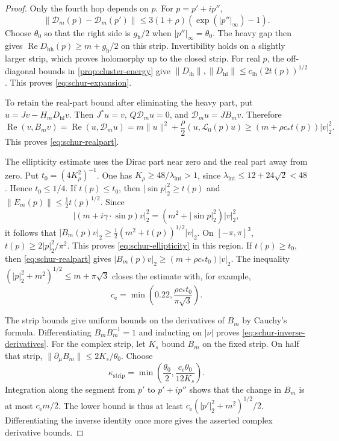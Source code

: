 \begin{proof}
Only the fourth hop depends on $p$. For $p=p'+ip''$,
\[
 \|\mathcal D_m(p)-\mathcal D_m(p')\|
       \le3(1+\rho)(\exp(|p''|_\infty)-1).
\]
Choose $\theta_0$ so that the right side is $g_{\mathrm h}/2$ when
$|p''|_\infty=\theta_0$. The heavy gap then gives
$\operatorname{Re}D_{\mathrm{hh}}(p)\ge m+g_{\mathrm h}/2$ on this
strip. Invertibility holds on a slightly larger strip, which proves
holomorphy up to the closed strip. For real $p$, the off-diagonal bounds
in \cref{prop:cluster-energy} give
$\|D_{\mathrm{lh}}\|,\|D_{\mathrm{hl}}\|
\le c_{\mathrm{lh}}(2t(p))^{1/2}$. This proves
\eqref{eq:schur-expansion}.

To retain the real-part bound after eliminating the heavy part, put
$u=Jv-H_mD_{\mathrm{hl}}v$. Then
$J^*u=v$, $Q\mathcal D_m u=0$, and
$\mathcal D_m u=JB_mv$. Therefore
\[
 \operatorname{Re}(v,B_mv)
   =\operatorname{Re}(u,\mathcal D_m u)
   =m\|u\|^2+\frac\rho2(u,\mathcal L_0(p)u)
   \ge(m+\rho c_*t(p))|v|_2^2.
\]
This proves \eqref{eq:schur-realpart}.

The ellipticity estimate uses the Dirac part near zero and the real
part away from zero. Put $t_0=(4K_\rho^2)^{-1}$. One has
$K_\rho\ge48/\lambda_{\mathrm{int}}>1$, since
$\lambda_{\mathrm{int}}\le12+24\sqrt2<48$.
Hence $t_0\le1/4$. If $t(p)\le t_0$, then
$|\sin p|_2^2\ge t(p)$ and
$\|E_m(p)\|\le\tfrac12t(p)^{1/2}$. Since
\[
 |(m+i\gamma\cdot\sin p)v|_2^2=(m^2+|\sin p|_2^2)|v|_2^2,
\]
it follows that
$|B_m(p)v|_2\ge\tfrac12(m^2+t(p))^{1/2}|v|_2$.
On $[-\pi,\pi]^3$, $t(p)\ge2|p|_2^2/\pi^2$. This proves
\eqref{eq:schur-ellipticity} in this region. If $t(p)\ge t_0$, then
\eqref{eq:schur-realpart} gives
$|B_m(p)v|_2\ge(m+\rho c_*t_0)|v|_2$.
The inequality $(|p|_2^2+m^2)^{1/2}\le m+\pi\sqrt3$ closes the
estimate with, for example,
\[
 c_{\mathrm e}=\min\left(0.22,\frac{\rho c_*t_0}{\pi\sqrt3}\right).
\]

The strip bounds give uniform bounds on the derivatives of $B_m$ by
Cauchy's formula. Differentiating $B_mB_m^{-1}=1$ and inducting on
$|\nu|$ proves \eqref{eq:schur-inverse-derivatives}. For the complex
strip, let $K_s$ bound $B_m$ on the fixed strip. On half that strip,
$\|\partial_\mu B_m\|\le2K_s/\theta_0$. Choose
\[
 \kappa_{\mathrm{strip}}=\min\left(\frac{\theta_0}{2},
                \frac{c_{\mathrm e}\theta_0}{12K_s}\right).
\]
Integration along the segment from $p'$ to $p'+ip''$ shows that the
change in $B_m$ is at most $c_{\mathrm e}m/2$. The lower bound is thus
at least $c_{\mathrm e}(|p'|_2^2+m^2)^{1/2}/2$. Differentiating the
inverse identity once more gives the asserted complex derivative bounds.
\end{proof}

